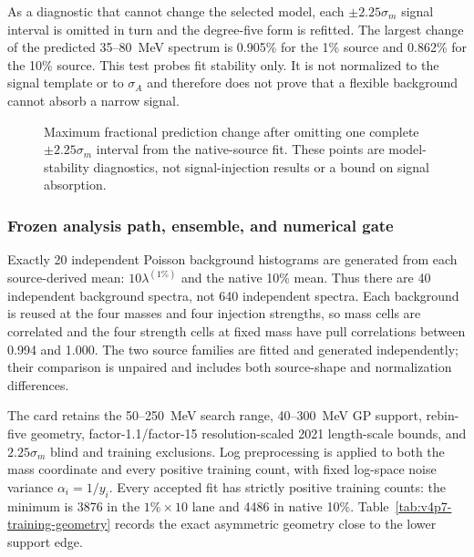 As a diagnostic that cannot change the selected model, each
$\pm2.25\sigma_m$ signal interval is omitted in turn and the degree-five form
is refitted.  The largest change of the predicted 35--80~MeV spectrum is
0.905\% for the 1\% source and 0.862\% for the 10\% source.  This test probes
fit stability only.  It is not normalized to the signal template or to
$\sigma_A$ and therefore does not prove that a flexible background cannot
absorb a narrow signal.

\begin{figure}[htbp]
\centering
{}
\caption{Maximum fractional prediction change after omitting one complete
$\pm2.25\sigma_m$ interval from the native-source fit.  These points are
model-stability diagnostics, not signal-injection results or a bound on signal
absorption.}
\label{fig:v4p7-near-threshold-leave-window-out}
\end{figure}

\subsubsection{Frozen analysis path, ensemble, and numerical gate}

Exactly 20 independent Poisson background histograms are generated from each
source-derived mean: $10\lambda^{(1\%)}$ and the native 10\% mean.  Thus there
are 40 independent background spectra, not 640 independent spectra.  Each
background is reused at the four masses and four injection strengths, so
mass cells are correlated and the four strength cells at fixed mass have pull
correlations between 0.994 and 1.000.  The two source families are fitted and
generated independently; their comparison is unpaired and includes both
source-shape and normalization differences.

The card retains the 50--250~MeV search range, 40--300~MeV GP support,
rebin-five geometry, factor-1.1/factor-15 resolution-scaled 2021 length-scale
bounds, and $2.25\sigma_m$ blind and training exclusions.  Log preprocessing
is applied to both the mass coordinate and every positive training count,
with fixed log-space noise variance $\alpha_i=1/y_i$.  Every accepted fit has
strictly positive training counts: the minimum is 3876 in the
$1\%\times10$ lane and 4486 in native 10\%.  Table~\ref{tab:v4p7-training-geometry}
records the exact asymmetric geometry close to the lower support edge.

